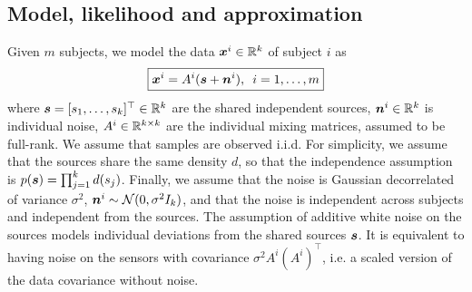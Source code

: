 \subsection{Model, likelihood and approximation}
%
Given $m$ subjects, we model the data $\boldsymbol{x}^i\in\mathbb{R}^k$ of subject $i$ as
\begin{equation}
\label{eq:ica_model}
\boxed{
    \boldsymbol{x}^i = A^i(\boldsymbol{s} + \boldsymbol{n}^i), \enspace i=1,\dots, m
    }
\end{equation}
where $\boldsymbol{s} = [s_1, \dots, s_k]^{\top} \in \mathbb{R}^k$ are the shared independent sources, $\boldsymbol{n}^i \in \mathbb{R}^k$ is individual noise, $A^i \in \mathbb{R}^{k\times k}$ are the individual mixing matrices, assumed to be full-rank.
%
We assume that samples are observed i.i.d. For simplicity, we assume that the sources share the same density $d$, so that the independence assumption is $p(\boldsymbol{s}) = \prod_{j=1}^k d(s_j)$. Finally, we assume that the noise is Gaussian decorrelated of variance $\sigma^2$, $\boldsymbol{n}^i \sim \mathcal{N}(0, \sigma^2I_k)$, and that the noise is independent across subjects and independent from the sources.
The assumption of additive white noise on the sources models individual deviations from the shared sources $\boldsymbol{s}$.
It is equivalent to having noise on the sensors with covariance $\sigma^2 A^i \left(A^i\right)^{\top}$, i.e. a scaled version of the data covariance without noise.

